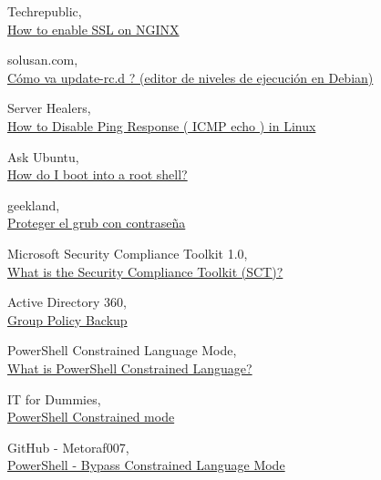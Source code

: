 \documentclass[10pt,a4paper]{article}
\begin{document}
\pagebreak
\begin{thebibliography}{9}

  Techrepublic,\\
  \href{https://www.techrepublic.com/article/how-to-enable-ssl-on-nginx/}{How to enable SSL on NGINX}
  
	solusan.com,\\
	\href{https://www.solusan.com/como-va-update-rcd-niveles-de-ejecucion-en-debian.html}{Cómo va update-rc.d ? (editor de niveles de ejecución en Debian)}
	
  Server Healers,\\
  \href{https://serverhealers.com/blog/disable-ping-response-icmp-echo-linux/}{How to Disable Ping Response ( ICMP echo ) in Linux}
  
	Ask Ubuntu,\\
	\href{https://askubuntu.com/questions/92556/how-do-i-boot-into-a-root-shell}{How do I boot into a root shell?}

	geekland,\\
	\href{https://geekland.eu/proteger-el-grub-con-contrasena/}{Proteger el grub con contraseña}

Microsoft Security Compliance Toolkit 1.0,\\
	\href{https://docs.microsoft.com/en-us/windows/security/threat-protection/windows-security-configuration-framework/security-compliance-toolkit-10}{What is the Security Compliance Toolkit (SCT)?}
	
  Active Directory 360,\\
  \href{https://www.windows-active-directory.com/active-directory-group-policy-backup.html}{Group Policy Backup}
  
  PowerShell Constrained Language Mode,\\
  \href{https://devblogs.microsoft.com/powershell/powershell-constrained-language-mode/}{What is PowerShell Constrained Language?}
 
	IT for Dummies,\\
	\href{https://itfordummies.net/2015/06/01/powershell-constrained-mode/}{PowerShell Constrained mode}

   GitHub - Metoraf007,\\
	\href{https://github.com/Metoraf007/Public_PowerShell/blob/master/Bypass_ConstrainedLang.ps1}{PowerShell - Bypass Constrained Language Mode}
	

\end{thebibliography}
\end{document}
